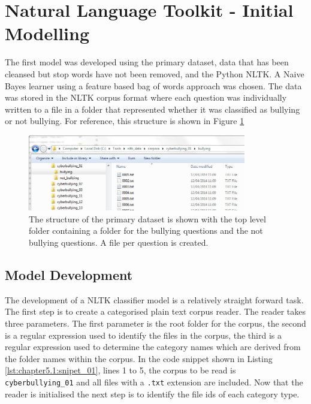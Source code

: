 \section{Natural Language Toolkit - Initial Modelling}
\label{subsection:nltk-initial_modelling}

The first model was developed using the primary dataset, data that has been cleansed but stop words have not been removed, and the Python NLTK. A Naive Bayes learner using a feature based bag of words approach was chosen. The data was stored in the NLTK corpus format where each question was individually written to a file in a folder that represented whether it was classified as bullying or not bullying. For reference, this structure is shown in Figure \ref{fig:chapter5:corpus_structure}

\begin{figure}[htbp]
	\centering
	\includegraphics[width=0.85\textwidth]{Figures/Chapter5/corpus_structure.jpg}
	\caption[The structure of the primary datset corpus]{The structure of the primary dataset is shown with the top level folder containing a folder for the bullying questions and the not bullying questions. A file per question is created.}
	\label{fig:chapter5:corpus_structure}
\end{figure}

\subsection{Model Development}

The development of a NLTK classifier model is a relatively straight forward task. The first step is to create a categorised plain text corpus reader. The reader takes three parameters. The first parameter is the root folder for the corpus, the second is a regular expression used to identify the files in the corpus, the third is a regular expression used to determine the category names which are derived from the folder names within the corpus. In the code snippet shown in Listing \ref{lst:chapter5.1:snipet_01}, lines 1 to 5, the corpus to be read is \verb|cyberbullying_01| and all files with a \verb|.txt| extension are included. Now that the reader is initialised the next step is to identify the file ids of each category type.

